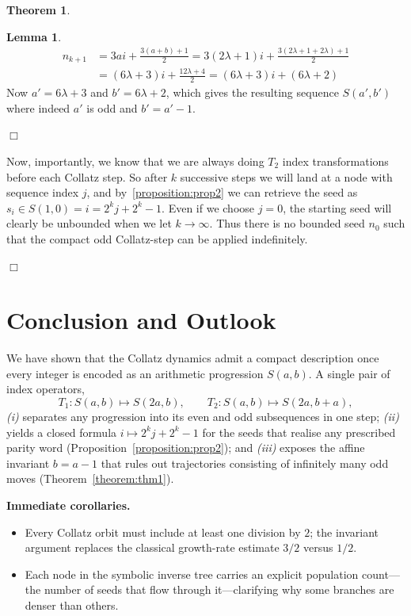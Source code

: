 \documentclass{article}
\theoremstyle{definition}
\newtheorem{theorem}{Theorem}[section]
\newtheorem{lemma}{Lemma}[section]
\begin{document}
\begin{theorem}
\begin{lemma}
\begin{equation*}
\begin{split}
    n_{k+1} &= 3ai + \frac{3(a+b)+1}{2} = 3(2\lambda+1)i + \frac{3(2\lambda+1+2\lambda)+1}{2}\\
    &= (6\lambda+3)i + \frac{12\lambda+4}{2} = (6\lambda+3)i + (6\lambda+2)
\end{split}
\end{equation*}
Now $a'=6\lambda+3$ and $b'=6\lambda+2$, which gives the resulting sequence $S(a',b')$ where indeed $a'$ is odd and $b'=a'-1$.
\end{lemma}
\begin{flushright}
$\Box$
\end{flushright}
Now, importantly, we know that we are always doing $T_2$ index transformations before each Collatz step. So after $k$ successive steps we will land at a node with sequence index $j$, and by~\ref{proposition:prop2} we can retrieve the seed as $s_i\in S(1,0) = i = 2^kj + 2^k -1$. Even if we choose $j=0$, the starting seed will clearly be unbounded when we let $k\longrightarrow\infty$. Thus there is no bounded seed $n_0$ such that the compact odd Collatz-step can be applied indefinitely.
\begin{flushright}
$\Box$
\end{flushright}
\end{theorem}

\section{Conclusion and Outlook}\label{sec:conclusion}

We have shown that the Collatz dynamics admit a compact
description once every integer is encoded as an arithmetic progression
\(S(a,b)\).  A single pair of index operators,
\[
  T_{1}:S(a,b)\longmapsto S(2a,b),
  \qquad
  T_{2}:S(a,b)\longmapsto S(2a,b+a),
\]
\emph{(i)} separates any progression into its even and odd
subsequences in one step; \emph{(ii)} yields a closed formula
\(i\mapsto 2^{k}j+2^{k}-1\) for the seeds that realise any prescribed
parity word (Proposition~\ref{proposition:prop2}); and \emph{(iii)} exposes the
affine invariant \(b=a-1\) that rules out trajectories consisting of
infinitely many odd moves (Theorem~\ref{theorem:thm1}).

\medskip
\noindent
\textbf{Immediate corollaries.}
\begin{itemize}
  \item Every Collatz orbit must include at least one division by \(2\); the
        invariant argument replaces the classical growth-rate estimate
        \(3/2\) versus \(1/2\).
  \item Each node in the symbolic inverse tree carries an explicit
        population count—the number of seeds that flow through
        it—clarifying why some branches are denser than others.
\end{itemize}
\end{document}
